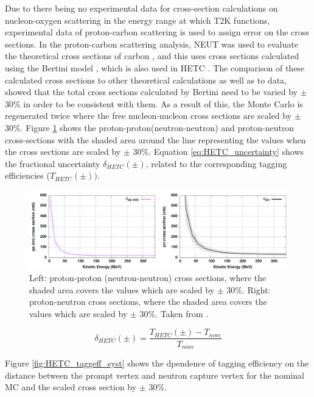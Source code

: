 Due to there being no experimental data for cross-section calculations on nucleon-oxygen scattering in the energy range at which T2K functions, experimental data of proton-carbon scattering is used to assign error on the cross sections. In the proton-carbon scattering analysis, NEUT was used to evaluate the theoretical cross sections of carbon \cite{hayato_neut}, and this uses cross sections calculated using the Bertini model \cite{bertini_hetc}, which is also used in HETC \cite{hetc_paper}. The comparison of these calculated cross sections to other theoretical calculations as well as to data, showed that the total cross sections calculated by Bertini need to be varied by $\pm$ 30\% in order to be consistent with them. As a result of this, the Monte Carlo is regenerated twice where the free nucleon-nucleon cross sections are scaled by $\pm$ 30\%. Figure \ref{fig:pp_nn_xsec} shows the proton-proton(neutron-neutron) and proton-neutron cross-sections with the shaded area around the line representing the values when the cross sections are scaled by $\pm$ 30\%. Equation \ref{eq:HETC_uncertainty} shows the fractional uncertainty $\delta_{HETC}(\pm)$, related to the corresponding tagging efficiencies ($T_{HETC}(\pm))$. 


\begin{figure}[!htb]
\centering
    \includegraphics[width=\textwidth]{Figures/pp_nn_xsec.PNG}
\caption{Left: proton-proton (neutron-neutron) cross sections, where the shaded area covers the values which are scaled by $\pm$ 30\%. Right: proton-neutron cross sections, where the shaded area covers the values which are scaled by $\pm$ 30\%. Taken from \cite{tn415_fiacob}.}
\label{fig:pp_nn_xsec}
\end{figure}



\begin{equation}
    \delta_{HETC }(\pm)=\frac{T_{HETC}(\pm)-T_{nom }}{T_{nom }}
\label{eq:HETC_uncertainty}
\end{equation}

Figure \ref{fig:HETC_taggeff_syst} shows the dpendence of tagging efficiency on the distance between the prompt vertex and neutron capture vertex for the nominal MC and the scaled cross section by $\pm$ 30\%. 



